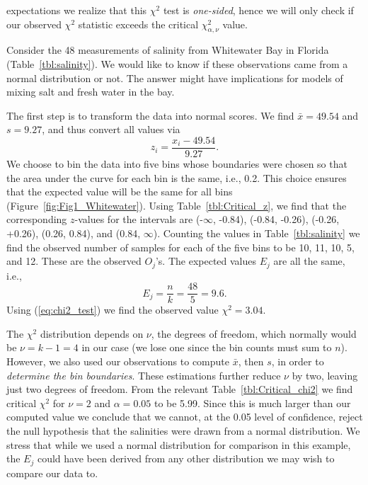 expectations we realize that this $\chi^2$ test is \emph{one-sided}, hence we will only check if our observed $\chi^2$
statistic exceeds the critical $\chi^2_{\alpha, \nu}$ value.
\begin{example}
Consider the 48 measurements of salinity from Whitewater Bay in Florida (Table~\ref{tbl:salinity}). We would like to
know if these observations came from a normal distribution or not.  The 
answer might have implications for models of mixing salt and fresh water in the bay.

	The first step is to transform the data into normal scores.  We find $\bar{x}  = 49.54$ and $s = 9.27$, and
thus convert all values via
\begin{equation}
z_i = \frac{x_i - 49.54}{9.27}.
\end{equation}	 
We choose to bin the data into five bins whose boundaries were chosen so that the area under the curve for each bin is the 
same, i.e., 0.2.  This choice ensures that the expected value will be the same for all bins (Figure~\ref{fig:Fig1_Whitewater}).
Using Table~\ref{tbl:Critical_z}, we find that the corresponding $z$-values 
for the intervals are (-$\infty$, -0.84), (-0.84, -0.26), (-0.26, +0.26), (0.26, 0.84), and (0.84, $\infty$).  Counting 
the values in Table~\ref{tbl:salinity} we find the observed number of samples for each of the five bins to be 10, 11, 
10, 5, and 12.  These are the observed $O_j$'s.  The expected values $E_j$ are all the same, i.e.,
\begin{equation}
E_j = \frac{n}{k} = \frac{48}{5} = 9.6.
\end{equation}
Using (\ref{eq:chi2_test}) we find the observed value $\chi^2 = 3.04$.

	The $\chi^2$ distribution depends on $\nu$, the degrees of freedom, which normally would be 
$\nu = k - 1 = 4$ in 
our case (we lose one since the bin counts must sum to $n$).  However, we also used our observations to
compute $\bar{x}$, then $s$, in order to \emph{determine the bin boundaries}.  These estimations further reduce $\nu$ by two, leaving 
just two degrees of freedom.  From the relevant Table~\ref{tbl:Critical_chi2} we find critical $\chi^2$ for $\nu = 2$ and $\alpha = 0.05$ to be 
5.99.  Since this is much larger than our computed value we conclude that we cannot, at the 0.05 level of confidence, reject the 
null hypothesis that the salinities were drawn from a normal distribution. 
We stress that while we used a normal distribution for comparison in this example, the $E_j$ could have 
been derived from any other distribution we may wish to compare our data to. 
\end{example}

